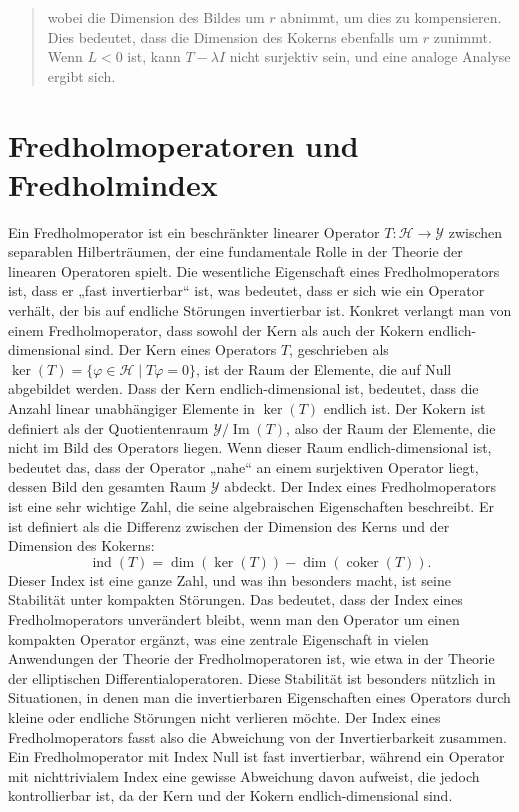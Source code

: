 \documentclass[11pt, hidelinks]{article}
\newcommand{\h}{\mathcal{H}}
\numberwithin{conj}{section}
\begin{document}
\begin{abstract}
wobei die Dimension des Bildes um \(r\) abnimmt, um dies zu kompensieren. Dies bedeutet, dass die Dimension des Kokerns ebenfalls um \(r\) zunimmt. Wenn \(L < 0\) ist, kann \(T - \lambda I\) nicht surjektiv sein, und eine analoge Analyse ergibt sich.
\end{abstract}

\begin{Large}
\tableofcontents
\end{Large}

\onehalfspacing

\section{Fredholmoperatoren und Fredholmindex}
Ein Fredholmoperator ist ein beschränkter linearer Operator \( T: \h \to \mathcal{Y} \) zwischen separablen Hilberträumen, der eine fundamentale Rolle in der Theorie der linearen Operatoren spielt. Die wesentliche Eigenschaft eines Fredholmoperators ist, dass er „fast invertierbar“ ist, was bedeutet, dass er sich wie ein Operator verhält, der bis auf endliche Störungen invertierbar ist. Konkret verlangt man von einem Fredholmoperator, dass sowohl der Kern als auch der Kokern endlich-dimensional sind. Der Kern eines Operators \( T \), geschrieben als \( \ker(T) = \{ \varphi \in \mathcal{H} \mid T\varphi = 0 \} \), ist der Raum der Elemente, die auf Null abgebildet werden. Dass der Kern endlich-dimensional ist, bedeutet, dass die Anzahl linear unabhängiger Elemente in \( \ker(T) \) endlich ist. Der Kokern ist definiert als der Quotientenraum \( \mathcal{Y} / \operatorname{Im}(T) \), also der Raum der Elemente, die nicht im Bild des Operators liegen. Wenn dieser Raum endlich-dimensional ist, bedeutet das, dass der Operator „nahe“ an einem surjektiven Operator liegt, dessen Bild den gesamten Raum \( \mathcal{Y} \) abdeckt. Der Index eines Fredholmoperators ist eine sehr wichtige Zahl, die seine algebraischen Eigenschaften beschreibt. Er ist definiert als die Differenz zwischen der Dimension des Kerns und der Dimension des Kokerns:
\[
\operatorname{ind}(T) = \dim(\ker(T)) - \dim(\operatorname{coker}(T)).
\]
Dieser Index ist eine ganze Zahl, und was ihn besonders macht, ist seine Stabilität unter kompakten Störungen. Das bedeutet, dass der Index eines Fredholmoperators unverändert bleibt, wenn man den Operator um einen kompakten Operator ergänzt, was eine zentrale Eigenschaft in vielen Anwendungen der Theorie der Fredholmoperatoren ist, wie etwa in der Theorie der elliptischen Differentialoperatoren. Diese Stabilität ist besonders nützlich in Situationen, in denen man die invertierbaren Eigenschaften eines Operators durch kleine oder endliche Störungen nicht verlieren möchte. Der Index eines Fredholmoperators fasst also die Abweichung von der Invertierbarkeit zusammen. Ein Fredholmoperator mit Index Null ist fast invertierbar, während ein Operator mit nichttrivialem Index eine gewisse Abweichung davon aufweist, die jedoch kontrollierbar ist, da der Kern und der Kokern endlich-dimensional sind.
\end{document}
